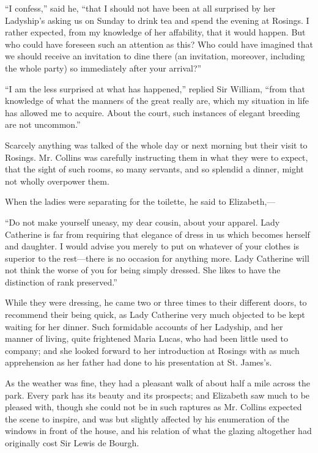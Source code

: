 \documentclass[10pt]{book}
\begin{document}
   “I confess,” said he, “that I should not have been at all surprised by
her Ladyship’s asking us on Sunday to
   drink tea and spend the evening
at Rosings. I rather expected, from my knowledge of her affability, that
it would happen. But who could have foreseen such an attention as this?
Who could have imagined that we should receive an invitation to dine
there (an invitation, moreover, including the whole party) so
immediately after your arrival?”
  

   “I am the less surprised at what has happened,” replied Sir William,
“from that knowledge of what the manners of the great really are, which
my situation in life has allowed me to acquire. About the court, such
instances of elegant breeding are not uncommon.”
  

   Scarcely anything was talked of the whole day or next morning but their
visit to Rosings. Mr. Collins was carefully instructing them in what
they were to expect, that the sight of such rooms, so many servants, and
so splendid a dinner, might not wholly overpower them.
  

   When the ladies were separating for the toilette, he said to
Elizabeth,—
  

   “Do not make yourself uneasy, my dear cousin, about your apparel. Lady
Catherine is far from requiring that elegance of dress in us which
becomes herself and daughter. I would advise you merely to put on
whatever of your clothes is superior to the rest—there is no occasion
for anything more. Lady Catherine will not think the worse of you for
being simply dressed. She likes to have the distinction of rank
preserved.”
  

   While they were dressing, he came two or three times to their different
doors, to recommend their being quick, as Lady Catherine very much
objected to be kept waiting for her dinner. Such formidable accounts of
her Ladyship, and her manner of living, quite frightened Maria
   Lucas,
who had been little used to company; and she looked forward to her
introduction at Rosings with as much apprehension as her father had done
to his presentation at St. James’s.
  

   As the weather was fine, they had a pleasant walk of about half a mile
across the park. Every park has its beauty and its prospects; and
Elizabeth saw much to be pleased with, though she could not be in such
raptures as Mr. Collins expected the scene to inspire, and was but
slightly affected by his enumeration of the windows in front of the
house, and his relation of what the glazing altogether had originally
cost Sir Lewis de Bourgh.
  
\end{document}
